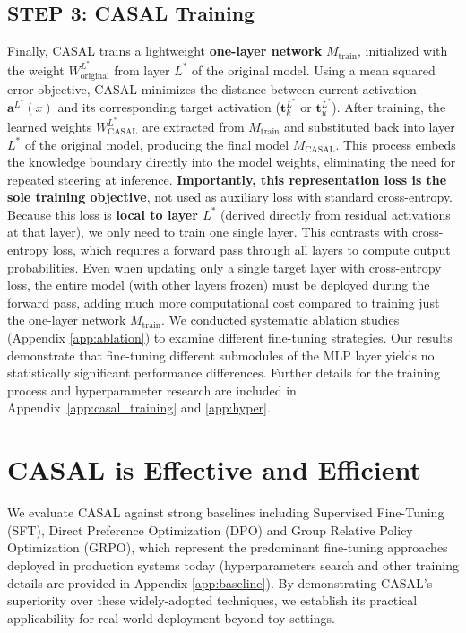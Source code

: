 \documentclass{article} %
\newcommand{\known}[1]{\textcolor{KnownGreen}{#1}}
\newcommand{\unknown}[1]{\textcolor{UnknownRed}{#1}}
\begin{document}
\subsection{STEP 3: CASAL Training}
 
Finally, CASAL trains a lightweight \textbf{one-layer network} $M_\text{train}$, initialized with the weight $W^{L^{*}}_{\text{original}}$ from layer $L^{*}$ of the original model. Using a mean squared error objective, CASAL minimizes the distance between current activation $\mathbf{a}^{L^{*}}(x)$ and its corresponding target activation (\known{$\mathbf{t}^{L^{*}}_{k}$} or \unknown{$\mathbf{t}^{L^{*}}_{u}$}). After training, the learned weights $W^{L^*}_{\text{CASAL}}$ are extracted from $M_\text{train}$ and substituted back into layer $L^*$ of the original model, producing the final model $M_{\text{CASAL}}$. This process embeds the knowledge boundary directly into the model weights, eliminating the need for repeated steering at inference. \textbf{Importantly, this representation loss is the sole training objective}, not used as auxiliary loss with standard cross-entropy. Because this loss is \textbf{local to layer $L^*$} (derived directly from residual activations at that layer), we only need to train one single layer. This contrasts with cross-entropy loss, which requires a forward pass through all layers to compute output probabilities. Even when updating only a single target layer with cross-entropy loss, the entire model (with other layers frozen) must be deployed during the forward pass, adding much more computational cost compared to training just the one-layer network $M_\text{train}$.  We conducted systematic ablation studies (Appendix \ref{app:ablation}) to examine different fine-tuning strategies. Our results demonstrate that fine-tuning different submodules of the MLP layer yields no statistically significant performance differences. Further details for the training process and hyperparameter research are included in Appendix~\ref{app:casal_training} and \ref{app:hyper}.

\section{CASAL is Effective and Efficient}

We evaluate CASAL against strong baselines including Supervised Fine-Tuning (SFT), Direct Preference Optimization (DPO) and  Group Relative Policy Optimization (GRPO), which represent the predominant fine-tuning approaches deployed in production systems today (hyperparameters search and other training details are provided in Appendix \ref{app:baseline}). By demonstrating CASAL's superiority over these widely-adopted techniques, we establish its practical applicability for real-world deployment beyond toy settings. 
\end{document}
